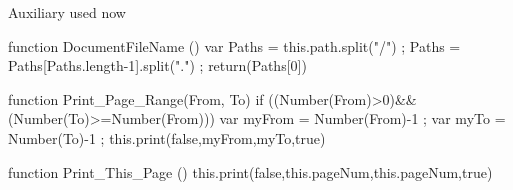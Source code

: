 
\startJSpreamble Auxiliary used now

  function DocumentFileName ()
    { var Paths = this.path.split("/") ;
      Paths = Paths[Paths.length-1].split(".") ;
      return(Paths[0]) }

  function Print_Page_Range(From, To) %
    { if ((Number(From)>0)&&(Number(To)>=Number(From)))
        { var myFrom = Number(From)-1 ;
          var myTo = Number(To)-1 ;
          this.print(false,myFrom,myTo,true) } }

  function Print_This_Page ()
    { this.print(false,this.pageNum,this.pageNum,true) }

\stopJSpreamble





\endinput